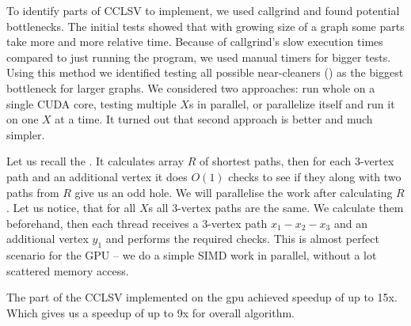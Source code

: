 

To identify parts of CCLSV to implement, we used callgrind and found potential bottlenecks. The initial tests showed that with growing size of a graph some parts take more and more relative time. Because of callgrind's slow execution times compared to just running the program, we used manual timers for bigger tests. Using this method we identified testing all possible near-cleaners () as the biggest bottleneck for larger graphs. We considered two approaches: run whole  on a single CUDA core, testing multiple $X$s in parallel, or parallelize  itself and run it on one $X$ at a time. It turned out that second approach is better and much simpler.

Let us recall the . It calculates array $R$ of shortest paths, then for each 3-vertex path and an additional vertex it does $O(1)$ checks to see if they along with two paths from $R$ give us an odd hole. We will parallelise the work after calculating $R$. Let us notice, that for all $X$s all 3-vertex paths are the same. We calculate them beforehand, then each thread receives a 3-vertex path $x_1 - x_2 - x_3$ and an additional vertex $y_1$ and performs the required checks. This is almost perfect scenario for the GPU -- we do a simple SIMD work in parallel, without a lot scattered memory access.

The part of the CCLSV implemented on the gpu achieved speedup of up to 15x. Which gives us a speedup of up to 9x for overall algorithm.

